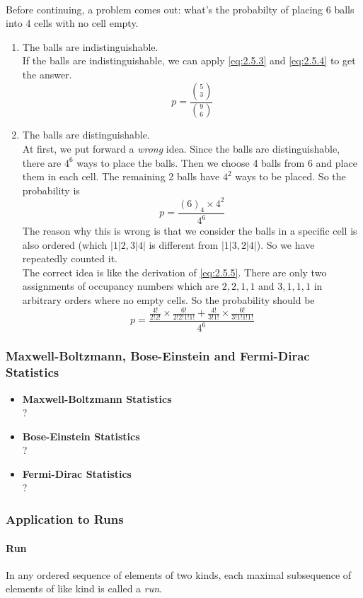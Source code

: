 \documentclass{article}
\numberwithin{equation}{subsection}
\begin{document}
			\paragraph{}Before continuing, a problem comes out: what's the probabilty of placing 6 balls into 4 cells with no cell empty.
			\begin{enumerate}
			\item The balls are indistinguishable. \\ If the balls are indistinguishable, we can apply \eqref{eq:2.5.3} and \eqref{eq:2.5.4} to get the answer. $$p=\frac{{5\choose 3}}{{9\choose 6}}$$
			\item The balls are distinguishable. \\ At first, we put forward a \textit{wrong} idea. Since the balls are distinguishable, there are $4^6$ ways to place the balls. Then we choose 4 balls from 6 and place them in each cell. The remaining 2 balls have $4^2$ ways to be placed. So the probability is
			$$p=\frac{(6)_4\times 4^2}{4^6}$$
			The reason why this is wrong is that we consider the balls in a specific cell is also ordered (which $|1|2,3|4|$ is different from $|1|3,2|4|$). So we have repeatedly counted it. \\ The correct idea is like the derivation of \eqref{eq:2.5.5}. There are only two assignments of occupancy numbers which are $2,2,1,1$ and $3,1,1,1$ in arbitrary orders where no empty cells. So the probability should be $$p=\frac{\frac{4!}{2!2!}\times\frac{6!}{2!2!1!1!}+\frac{4!}{3!1!}\times\frac{6!}{3!1!1!1!}}{4^6}$$
			\end{enumerate}
			\subsubsection{Maxwell-Boltzmann, Bose-Einstein and Fermi-Dirac Statistics}
			\begin{itemize}
			\item \textbf{Maxwell-Boltzmann Statistics} \\ ?
			\item \textbf{Bose-Einstein Statistics} \\ ?
			\item \textbf{Fermi-Dirac Statistics} \\ ?
			\end{itemize}
			\subsubsection{Application to Runs}
			\paragraph{Run} In any ordered sequence of elements of two kinds, each maximal subsequence of elements of like kind is called a \textit{run}. 
\end{document}
